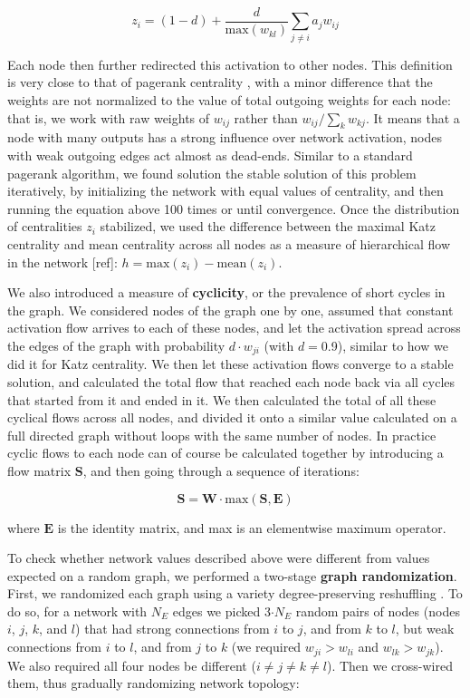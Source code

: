\documentclass{article}
\begin{document}
$$z_i = (1-d) + \frac{d}{\text{max}(w_{kl})} \sum_{j \neq i}{a_j w_{ij}}$$

Each node then further redirected this activation to other nodes. This definition is very close to that of pagerank centrality \citep{page1999pagerank}, with a minor difference that the weights are not normalized to the value of total outgoing weights for each node: that is, we work with raw weights of $w_{ij}$ rather than $w_{ij}/\sum_k{w_{kj}}$. It means that a node with many outputs has a strong influence over network activation, nodes with weak outgoing edges act almost as dead-ends. Similar to a standard pagerank algorithm, we found solution the stable solution of this problem iteratively, by initializing the network with equal values of centrality, and then running the equation above 100 times or until convergence. Once the distribution of centralities $z_i$ stabilized, we used the difference between the maximal Katz centrality and mean centrality across all nodes as a measure of hierarchical flow in the network [ref]: $h = \text{max}(z_i) - \text{mean}(z_i)$.

We also introduced a measure of \textbf{cyclicity}, or the prevalence of short cycles in the graph. We considered nodes of the graph one by one, assumed that constant activation flow arrives to each of these nodes, and let the activation spread across the edges of the graph with probability $d \cdot w_{ji}$ (with $d = $0.9), similar to how we did it for Katz centrality. We then let these activation flows converge to a stable solution, and calculated the total flow that reached each node back via all cycles that started from it and ended in it. We then calculated the total of all these cyclical flows across all nodes, and divided it onto a similar value calculated on a full directed graph without loops with the same number of nodes. In practice cyclic flows to each node can of course be calculated together by introducing a flow matrix $\textbf{S}$, and then going through a sequence of iterations: 

$$\textbf{S} = \textbf{W} \cdot \text{max}(\textbf{S} , \textbf{E}) $$

where $\textbf{E}$ is the identity matrix, and max is an elementwise maximum operator.

To check whether network values described above were different from values expected on a random graph, we performed a two-stage \textbf{graph randomization}. First, we randomized each graph using a variety degree-preserving reshuffling \citep{maslov2002}. To do so, for a network with $N_E$ edges we picked 3$\cdot N_E$ random pairs of nodes (nodes $i$, $j$, $k$, and $l$) that had strong connections from $i$ to $j$, and from $k$ to $l$, but weak connections from $i$ to $l$, and from $j$ to $k$ (we required $w_{ji}>w_{li}$ and $w_{lk}>w_{jk}$). We also required all four nodes be different ($i \neq j \neq k \neq l$). Then we cross-wired them, thus gradually randomizing network topology:
\end{document}
